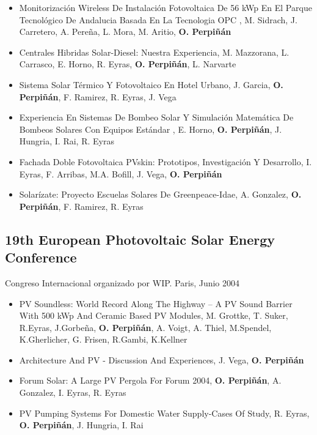 \documentclass[article, a4paper]{memoir}
\begin{document}
\begin{itemize}
\item Monitorización Wireless De Instalación Fotovoltaica De 56 kWp En El Parque Tecnológico De Andalucia Basada En La Tecnologia OPC , M. Sidrach, J. Carretero, A. Pereña, L. Mora, M. Aritio, \textbf{O. Perpiñán}

\item Centrales Hibridas Solar-Diesel: Nuestra Experiencia, M. Mazzorana, L. Carrasco, E. Horno, R. Eyras, \textbf{O. Perpiñán}, L.  Narvarte

\item Sistema Solar Térmico Y Fotovoltaico En Hotel Urbano, J. Garcia, \textbf{O. Perpiñán}, F. Ramirez, R. Eyras, J. Vega

\item Experiencia En Sistemas De Bombeo Solar Y Simulación Matemática De Bombeos Solares Con Equipos Estándar , E. Horno, \textbf{O. Perpiñán}, J. Hungria, I. Rai, R. Eyras

\item Fachada Doble Fotovoltaica PVskin: Prototipos, Investigación Y Desarrollo, I. Eyras, F. Arribas, M.A. Bofill, J. Vega, \textbf{O. Perpiñán}

\item Solarízate: Proyecto Escuelas Solares De Greenpeace-Idae, A. Gonzalez, \textbf{O. Perpiñán}, F. Ramirez, R. Eyras
\end{itemize}

\subsection{19th European Photovoltaic Solar Energy Conference}
\label{sec:org3a6c6ad}
Congreso Internacional organizado por WIP. Paris, Junio 2004

\begin{itemize}
\item PV Soundless: World Record Along The Highway -- A PV Sound Barrier With 500 kWp And Ceramic Based PV Modules, M. Grottke, T. Suker, R.Eyras, J.Gorbeña, \textbf{O. Perpiñán}, A. Voigt, A.  Thiel, M.Spendel, K.Gherlicher, G. Frisen, R.Gambi, K.Kellner

\item Architecture And PV - Discussion And Experiences, J. Vega, \textbf{O. Perpiñán}

\item Forum Solar: A Large PV Pergola For Forum 2004, \textbf{O. Perpiñán}, A. Gonzalez, I. Eyras, R. Eyras

\item PV Pumping Systems For Domestic Water Supply-Cases Of Study, R. Eyras, \textbf{O. Perpiñán}, J. Hungria, I. Rai
\end{itemize}
\end{document}
